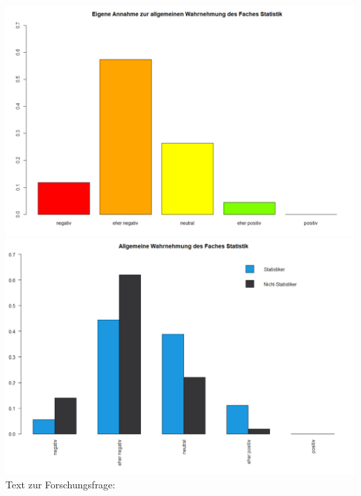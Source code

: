 \documentclass[12pt,a4paper,titlepage=true,parskip,ngerman]{scrartcl}
\begin{document}
\hspace{-2cm}
\includegraphics[scale=0.3]{barplot_Wahrnehmung}
\includegraphics[scale=0.3]{(nicht)-statis_barplot_Wahrnehmung}\\


Text zur Forschungsfrage:
\end{document}
